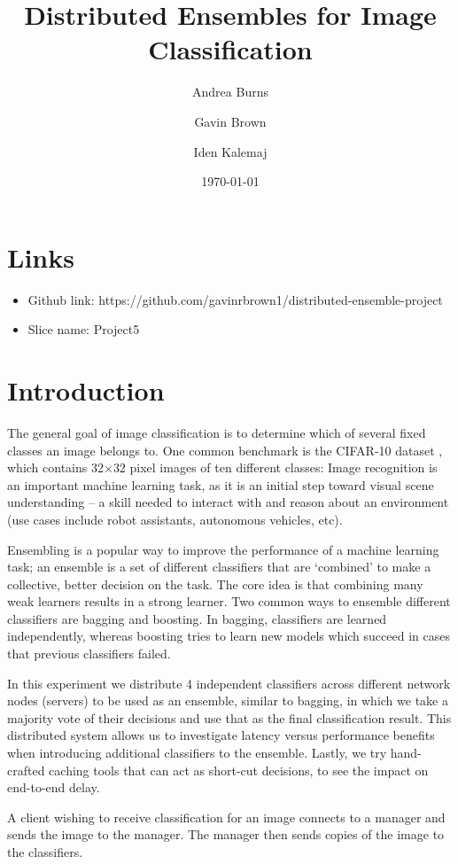 \documentclass[12pt]{article}
\title{Distributed Ensembles for Image Classification}
\author{Andrea Burns \and Gavin Brown \and Iden Kalemaj}
\date{\today}
\begin{document}
\maketitle
\section{Links}
\begin{itemize}
	\item Github link: https://github.com/gavinrbrown1/distributed-ensemble-project
	\item Slice name: Project5
\end{itemize}


\section{Introduction}

The general goal of image classification is to determine which of several fixed classes an image belongs to. 
One common benchmark is the CIFAR-10 dataset \cite{cifar10}, which contains 32$\times$32 pixel images of ten different classes: 
Image recognition is an important machine learning task, as it is an initial step toward visual scene understanding -- a skill needed to interact with and reason about an environment (use cases include robot assistants, autonomous vehicles, etc).

Ensembling is a popular way to improve the performance of a machine learning task; an ensemble is a set of different classifiers that are ‘combined’ to make a collective, better decision on the task. The core idea is that combining many weak learners results in a strong learner. Two common ways to ensemble different classifiers are bagging and boosting. In bagging, classifiers are learned independently, whereas boosting tries to learn new models which succeed in cases that previous classifiers failed. 

In this experiment we distribute 4 independent classifiers across different network nodes (servers) to be used as an ensemble, similar to bagging, in which we take a majority vote of their decisions and use that as the final classification result. This distributed system allows us to investigate latency versus performance benefits when introducing additional classifiers to the ensemble. Lastly, we try hand-crafted caching tools that can act as short-cut decisions, to see the impact on end-to-end delay.

A client wishing to receive classification for an image connects to a manager and sends the image to the manager. The manager then sends copies of the image to the classifiers.
\end{document}
